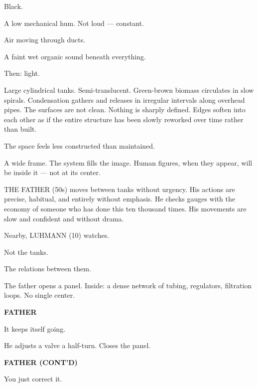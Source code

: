 \documentclass[12pt]{article}
\newcommand{\character}[1]{%
  \vspace{8pt}%
  \begin{center}\textbf{#1}\end{center}%
  \vspace{-4pt}%
}
\newenvironment{dialogue}{%
  \begin{center}%
  \begin{minipage}{0.62\textwidth}%
}{%
  \end{minipage}%
  \end{center}%
  \vspace{4pt}%
}
\newenvironment{action}{%
  \vspace{4pt}%
  \noindent\ignorespaces%
}{%
  \vspace{6pt}%
}
\begin{document}
\begin{action}
Black.

\medskip

A low mechanical hum. Not loud — constant.

Air moving through ducts.

A faint wet organic sound beneath everything.

\medskip

Then: light.

\medskip

Large cylindrical tanks. Semi-translucent. Green-brown biomass circulates in slow spirals. Condensation gathers and releases in irregular intervals along overhead pipes. The surfaces are not clean. Nothing is sharply defined. Edges soften into each other as if the entire structure has been slowly reworked over time rather than built.

The space feels less constructed than maintained.

\medskip

A wide frame. The system fills the image. Human figures, when they appear, will be inside it — not at its center.

\medskip

THE FATHER (50s) moves between tanks without urgency. His actions are precise, habitual, and entirely without emphasis. He checks gauges with the economy of someone who has done this ten thousand times. His movements are slow and confident and without drama.

\medskip

Nearby, LUHMANN (10) watches.

Not the tanks.

The relations between them.

\medskip

The father opens a panel. Inside: a dense network of tubing, regulators, filtration loops. No single center.
\end{action}

\character{FATHER}
\begin{dialogue}
It keeps itself going.
\end{dialogue}

\begin{action}
He adjusts a valve a half-turn. Closes the panel.
\end{action}

\character{FATHER (CONT'D)}
\begin{dialogue}
You just correct it.
\end{dialogue}
\end{document}
